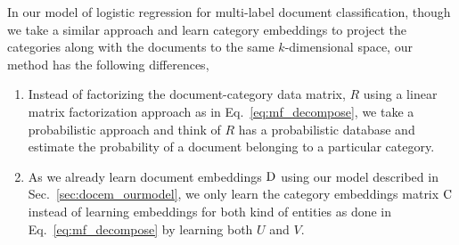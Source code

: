 In our model of logistic regression for multi-label document classification, though we take a similar approach and learn category embeddings to project the categories along with the documents to the same $k$-dimensional space, our method has the following differences,
\begin{enumerate}
\item Instead of factorizing the document-category data matrix, $R$ using a linear matrix factorization approach as in Eq.~\ref{eq:mf_decompose}, we take a probabilistic approach and think of $R$ has a probabilistic database and estimate the probability of a document belonging to a particular category.

\item As we already learn document embeddings $\mathrm{D}$ using our model described in Sec.~\ref{sec:docem_ourmodel}, we only learn the category embeddings matrix $\mathrm{C}$ instead of learning embeddings for both kind of entities as done in Eq.~\ref{eq:mf_decompose} by learning both $U$ and $V$.
\end{enumerate}

